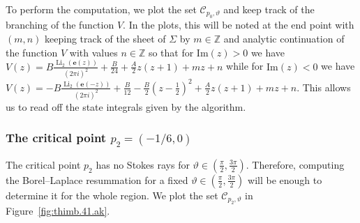 \documentclass[12pt,reqno]{amsart}
\theoremstyle{definition}
\def\BZ{\mathbb Z}
\def\calC{\mathcal C}
\def\Im{\mathrm{Im}}
\def\e{\mathbf e}
\renewcommand{\=}{\;=\;}
\newcommand{\Li}{\operatorname{Li}}
\begin{document}

To perform the computation, we plot the set $\calC_{p_0,\vartheta}$ and keep track of the branching of the function $V$. In the plots, this will be noted at the end point with $(m,n)$ keeping track of the sheet of $\Sigma$ by $m\in\BZ$ and analytic continuation of the function $V$ with values $n\in\BZ$ so that for $\Im(z)>0$ we have $V(z)=B\tfrac{\Li_{2}(\e(z))}{(2\pi i)^2}+\tfrac{B}{24}+\tfrac{A}{2}z(z+1)+mz+n$ while for $\Im(z)<0$ we have $V(z)=-B\tfrac{\Li_{2}(\e(-z))}{(2\pi i)^2}+\tfrac{B}{12}-\tfrac{B}{2}(z-\tfrac{1}{2})^2+\tfrac{A}{2}z(z+1)+mz+n$. This allows us to read off the state integrals given by the algorithm.
%
\subsubsection{The critical point $p_2=(-1/6,0)$}
%
The critical point $p_2$ has no Stokes rays for $\vartheta\in(\tfrac{\pi}{2},\tfrac{3\pi}{2})$. Therefore, computing the Borel--Laplace resummation for a fixed $\vartheta\in(\tfrac{\pi}{2},\tfrac{3\pi}{2})$ will be enough to determine it for the whole region. We plot the set $\calC_{p_2,\vartheta}$ in Figure~\ref{fig:thimb.41.ak}.
\end{document}
